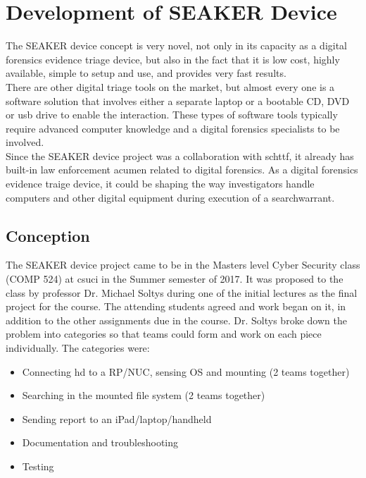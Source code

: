 \documentclass[12pt]{article}
\begin{document}
\section{Development of SEAKER Device}
\label{sect-developmentSeakerDevice}

The SEAKER device concept is very novel, not only in its capacity as a digital 
forensics evidence triage device, but also in the fact that it is low cost, highly
available, simple to setup and use, and provides very fast results.\\

There are other digital triage tools on the market, but almost every one is a
software solution that involves either a separate laptop or a bootable
CD, DVD or \gls{usb} drive to enable the interaction.  These types of software tools
typically require advanced computer knowledge and a digital forensics specialists
to be involved.\\

Since the SEAKER device project was a collaboration with \gls{schttf}, it already has
built-in law enforcement acumen related to digital forensics.  As a digital
forensics evidence traige device, it could be shaping the way investigators
handle computers and other digital equipment during execution of a \gls{searchwarrant}.\\

\subsection{Conception}

The SEAKER device project came to be in the Masters level Cyber Security class (COMP 524)
at \gls{csuci} in the Summer semester of 2017.  It was proposed to the class by professor 
Dr. Michael Soltys during one of the initial lectures as the final project for the
course.  The attending students agreed and work began on it, in addition to the other
assignments due in the course.  Dr. Soltys broke down the problem into categories so
that teams could form and work on each piece individually.  The categories were:

\vspace{0.5 cm}
\begin{itemize}
  \item Connecting hd to a RP/NUC, sensing OS and mounting (2 teams together)
  \item Searching in the mounted file system (2 teams together)
  \item Sending report to an iPad/laptop/handheld
  \item Documentation and troubleshooting
  \item Testing
\end{itemize}
\vspace{0.5 cm}
\end{document}
